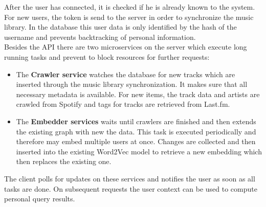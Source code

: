 \documentclass[sigconf]{acmart}
\begin{document}
After the user has connected, it is checked if he is already known to the system. For new users, the token is send to the server in order to synchronize the music library. In the database this user data is only identified by the hash of the username and prevents backtracking of personal information.\\

Besides the API there are two microservices on the server which execute long running tasks and prevent to block resources for further requests:
\begin{itemize}
	\item The \textbf{Crawler service} watches the database for new tracks which are inserted through the music library synchronization. It makes sure that all necessary metadata is available. For new items, the track data and artists are crawled from Spotify and tags for tracks are retrieved from Last.fm.
	\item The \textbf{Embedder services} waits until crawlers are finished and then extends the existing graph with new the data. This task is executed periodically and therefore may embed multiple users at once. Changes are collected and then inserted into the existing Word2Vec model to retrieve a new embedding which then replaces the existing one.
\end{itemize}

The client polls for updates on these services and notifies the user as soon as all tasks are done. On subsequent requests the user context can be used to compute personal query results. 
\end{document}
